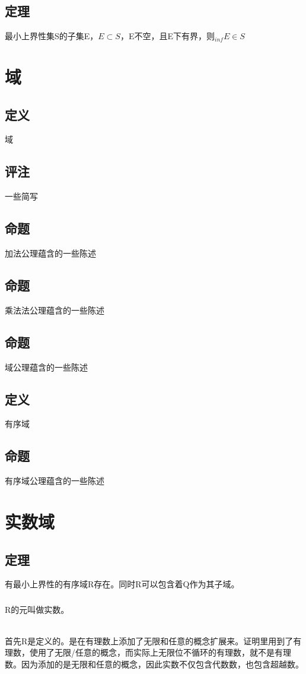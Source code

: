 \section{定理} 最小上界性集S的子集E，$E \subset S$，E不空，且E下有界，则$ _{inf}E \in S$
\subparagraph*{}
\chapter*{域}
\section{定义} 域
\section{评注} 一些简写
\section{命题} 加法公理蕴含的一些陈述
\section{命题} 乘法法公理蕴含的一些陈述
\section{命题} 域公理蕴含的一些陈述
\section{定义} 有序域
\section{命题} 有序域公理蕴含的一些陈述
\subparagraph*{}
\chapter*{实数域}
\section{定理}有最小上界性的有序域R存在。同时R可以包含着Q作为其子域。
\paragraph{}R的元叫做实数。
\subparagraph{}首先R是定义的。是在有理数上添加了无限和任意的概念扩展来。证明里用到了有理数，使用了无限/任意的概念，而实际上无限位不循环的有理数，就不是有理数。因为添加的是无限和任意的概念，因此实数不仅包含代数数，也包含超越数。
